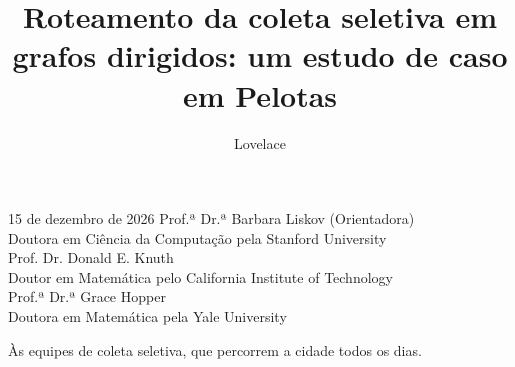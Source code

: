 \documentclass[diss,capa]{texufpel}
\title{Roteamento da coleta seletiva em grafos dirigidos: um estudo de caso em Pelotas}
\author{Lovelace}{Ada}                          %
\begin{document}
\renewcommand{\advisorname}{Orientadora}

\maketitle   %

\fichacatalografica


\begin{aprovacao}{15 de dezembro de 2026}
\noindent Prof.ª Dr.ª Barbara Liskov (Orientadora)\\
Doutora em Ciência da Computação pela Stanford University\\[1cm]

\noindent Prof. Dr. Donald E. Knuth\\
Doutor em Matemática pelo California Institute of Technology\\[1cm]

\noindent Prof.ª Dr.ª Grace Hopper\\
Doutora em Matemática pela Yale University
\end{aprovacao}

\begin{dedicatoria}
Às equipes de coleta seletiva, que percorrem a cidade todos os dias.
\end{dedicatoria}
\end{document}
